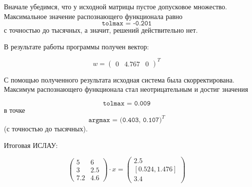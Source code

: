 Вначале убедимся, что у исходной матрицы пустое допусковое множество. Максимальное значение распознающего функционала равно 
\begin{equation}
\texttt{tolmax = -0.201}
\end{equation}
с точностью до тысячных, а значит, решений действительно нет.

В результате работы  программы получен вектор:

\begin{equation}
w=\begin{pmatrix}
0 & 4.767 & 0
\end{pmatrix}^T
\end{equation}

С помощью полученного результата исходная система была скорректирована. Максимум распознающего функционала стал неотрицательным и достиг значения

\begin{equation}
\texttt{tolmax = 0.009}
\end{equation}
в точке 
\begin{equation}
\texttt{argmax = (0.403, 0.107)}^T
\end{equation}
(с точностью до тысячных).

Итоговая ИСЛАУ:

\begin{equation}
\begin{pmatrix}
	5 & 6 \\
	3 & 2.5 \\
	7.2 & 4.6
\end{pmatrix} \cdot x = 
\begin{pmatrix}
2.5 \\
[0.524, 1.476] \\
3.4
\end{pmatrix}
\end{equation}